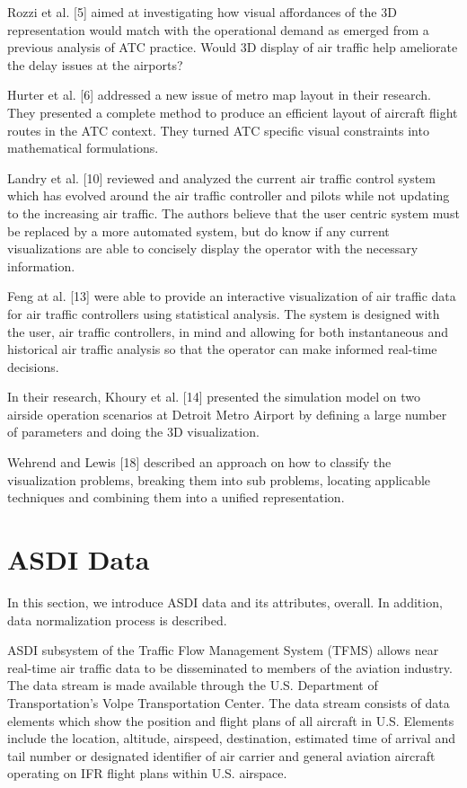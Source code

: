\documentclass{sig-alternate}
\begin{document}
Rozzi et al. [5] aimed at investigating how
visual affordances of the 3D representation would
match with the operational demand as emerged
from a previous analysis of ATC practice. Would
3D display of air traffic help ameliorate the delay
issues at the airports?

Hurter et al. [6] addressed a new issue of
metro map layout in their research. They presented
a complete method to produce an efficient layout of
aircraft flight routes in the ATC context. They
turned ATC specific visual constraints into
mathematical formulations.

Landry et al. [10] reviewed and analyzed
the current air traffic control system which has
evolved around the air traffic controller and pilots
while not updating to the increasing air traffic. The
authors believe that the user centric system must be
replaced by a more automated system, but do
know if any current visualizations are able to
concisely display the operator with the necessary
information.

Feng at al. [13] were able to provide an
interactive visualization of air traffic data for air
traffic controllers using statistical analysis. The
system is designed with the user, air traffic
controllers, in mind and allowing for both
instantaneous and historical air traffic analysis so
that the operator can make informed real-time
decisions.

In their research, Khoury et al. [14]
presented the simulation model on two airside
operation scenarios at Detroit Metro Airport by
defining a large number of parameters and doing
the 3D visualization.

Wehrend and Lewis [18] described an
approach on how to classify the visualization
problems, breaking them into sub problems,
locating applicable techniques and combining them
into a unified representation.

\section{ASDI Data}
\label{sec-asdi}

In this section, we introduce ASDI data and its
attributes, overall. In addition, data normalization
process is described.

ASDI subsystem of the Traffic Flow
Management System (TFMS) allows near
real-time air traffic data to be disseminated to
members of the aviation industry. The data stream
is made available through the U.S. Department
of Transportation's Volpe Transportation Center.
The data stream consists of data elements which
show the position and flight plans of all aircraft
in U.S. Elements include the location, altitude,
airspeed, destination, estimated time of arrival and
tail number or designated identifier of air carrier
and general aviation aircraft operating on IFR flight
plans within U.S. airspace.
\end{document}
